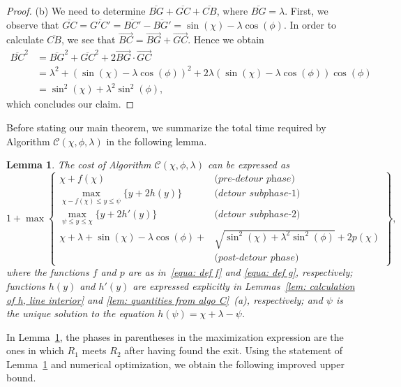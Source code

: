 \documentclass[
final
]{dmtcs-episciences}
\newcommand{\barr}[1]{\overline{#1}}
\newcommand{\vect}[1]{\overrightarrow{#1}}
\newcommand{\sinn}[1]{\sin \left({#1}\right)}
\newcommand{\coss}[1]{\cos \left({#1}\right)}
\newcommand{\RA}{\ensuremath{R_1}}
\newcommand{\RB}{\ensuremath{R_2 }}
\newtheorem{lemma}[theorem]{Lemma}
\theoremstyle{definition}
\begin{document}
\begin{proof}
(b) We need to determine $\barr{BG}+\barr{GC}+\barr{CB}$, where $\barr{BG}=\lambda$. First, we observe that 
$
\barr{GC} = \barr{G'C'}=\barr{BC'}-\barr{BG'} = \sinn{\chi} - \lambda \coss{\phi}.
$
In order to calculate $\barr{CB}$, we see that $\vect{BC}=\vect{BG}+\vect{GC}$. Hence we obtain
\begin{align*}
\barr{BC}^2
&=\barr{BG}^2+\barr{GC}^2 + 2\vect{BG}\cdot\vect{GC} \\
&= \lambda^2 + \left(\sinn{\chi} - \lambda \coss{\phi}\right)^2 + 2\lambda \left(\sinn{\chi} - \lambda \coss{\phi}\right) \coss{\phi} \\
& = \sin^2(\chi)+\lambda^2\sin^2(\phi),
\end{align*}
which concludes our claim.  
\end{proof}

Before stating our main theorem, we summarize the total time required by Algorithm $\mathcal C(\chi, \phi, \lambda)$ in the following lemma.

\begin{lemma}\label{lem: cost of piecewise line algo with parameters}
The cost of Algorithm $\mathcal C(\chi, \phi, \lambda)$ can be expressed as 
$$
1+\max
\left\{
\begin{array}{lr}
\chi + f(\chi) & \textit{(pre-detour phase)} \\
\max_{\chi-f(\chi) \leq y \leq \psi} \{ y + 2h(y)\}& \textit{(detour subphase-1)} \\
\max_{\psi \leq y \leq \chi} \{ y + 2h'(y)\} & \textit{(detour subphase-2)} \\
\chi + \lambda+\sinn{\chi}-\lambda\coss{\phi}+
&\sqrt{\sin^2(\chi)+\lambda^2\sin^2(\phi)} + 2p(\chi)\\
  &\textit{(post-detour phase)}
\end{array}
\right\},
$$
where the functions $f$ and $p$ are as in~\eqref{equa: def f} and \eqref{equa: def g}, respectively; functions $h(y)$ and $h'(y)$ are expressed explicitly in Lemmas~\ref{lem: calculation of h, line interior} and \ref{lem: quantities from algo C}~(a), respectively; and $\psi$ is the unique solution to the equation $h(\psi) = \chi+\lambda - \psi$. 
\end{lemma}

In Lemma~\ref{lem: cost of piecewise line algo with parameters}, the phases in parentheses in the maximization expression are the ones in which $\RA$ meets $\RB$ after having found the exit.
Using the statement of Lemma~\ref{lem: cost of piecewise line algo with parameters} and numerical optimization, we obtain the following improved upper bound.
\end{document}
